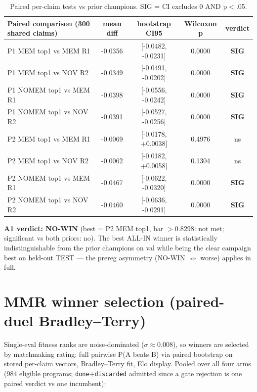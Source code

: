 \documentclass[10pt]{article}
\begin{document}
\begin{table}[H]\centering
\begin{tabular}{lcccc}
\toprule
Paired comparison (300 shared claims) & mean diff & bootstrap CI95 & Wilcoxon p & verdict \\
\midrule
P1 MEM top1 vs MEM R1 & -0.0356 & [-0.0482, -0.0231] & 0.0000 & \textcolor{good}{\textbf{SIG}} \\
P1 MEM top1 vs NOV R2 & -0.0349 & [-0.0491, -0.0202] & 0.0000 & \textcolor{good}{\textbf{SIG}} \\
P1 NOMEM top1 vs MEM R1 & -0.0398 & [-0.0556, -0.0242] & 0.0000 & \textcolor{good}{\textbf{SIG}} \\
P1 NOMEM top1 vs NOV R2 & -0.0391 & [-0.0527, -0.0256] & 0.0000 & \textcolor{good}{\textbf{SIG}} \\
P2 MEM top1 vs MEM R1 & -0.0069 & [-0.0178, +0.0038] & 0.4976 & ns \\
P2 MEM top1 vs NOV R2 & -0.0062 & [-0.0182, +0.0058] & 0.1304 & ns \\
P2 NOMEM top1 vs MEM R1 & -0.0467 & [-0.0622, -0.0320] & 0.0000 & \textcolor{good}{\textbf{SIG}} \\
P2 NOMEM top1 vs NOV R2 & -0.0460 & [-0.0636, -0.0291] & 0.0000 & \textcolor{good}{\textbf{SIG}} \\
\bottomrule
\end{tabular}
\caption{Paired per-claim tests vs prior champions. SIG = CI excludes 0 AND p$<$.05.}
\end{table}

\textbf{A1 verdict: \textcolor{warn}{NO-WIN}} (best = P2 MEM top1,
bar $>0.8298$: not met;
significant vs both priors: no).
The best ALL-IN winner is statistically indistinguishable from the prior champions
on val while being the clear campaign best on held-out TEST --- the prereg
asymmetry (NO-WIN $\not\Rightarrow$ worse) applies in full.

\section*{MMR winner selection (paired-duel Bradley--Terry)}
Single-eval fitness ranks are noise-dominated ($\sigma \approx 0.008$), so winners
are selected by matchmaking rating: full pairwise P(A beats B) via paired bootstrap
on stored per-claim vectors, Bradley--Terry fit, Elo display. Pooled over all four
arms (984 eligible programs; \texttt{done}+\texttt{discarded} admitted since a
gate rejection is one paired verdict vs one incumbent):
\end{document}
